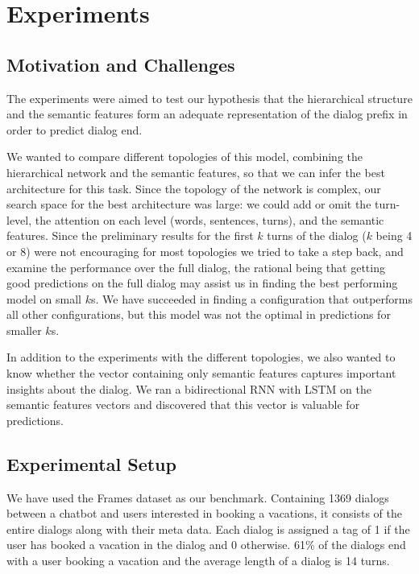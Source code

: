 \section{Experiments}\label{sec:exp}
\subsection{Motivation and Challenges}
The experiments were aimed to test our hypothesis that the hierarchical 
structure and the semantic features form an adequate representation of 
the dialog prefix in order to predict dialog end. 

We wanted to compare different topologies of this model, 
combining the hierarchical network and the semantic features, 
so that we can infer the best architecture for this task. 
Since the topology of the network is complex, our search space for the best architecture 
was large: we could add or omit the turn-level, the attention on each level (words, sentences, turns), 
and the semantic features. 
Since the preliminary results for the first $k$ turns of the dialog ($k$ being 4 or 8) 
were not encouraging for most topologies we tried to take a step back, 
and examine the performance over the full dialog, 
the rational being that getting good predictions on the full dialog may assist 
us in finding the best performing model on small $k$s. 
We have succeeded in finding a configuration that outperforms all other configurations, 
but this model was not the optimal in predictions for smaller $k$s. 

In addition to the experiments with the different topologies, we also wanted to know whether the vector containing only semantic features 
captures important insights about the dialog. 
We ran a bidirectional RNN with LSTM on the semantic features vectors and 
discovered that this vector is valuable for predictions.

\subsection{Experimental Setup}
We have used the Frames dataset \cite{frames} as 
our benchmark. Containing 1369 dialogs between 
a chatbot and users interested in booking a vacations, 
it consists of the entire dialogs along with their meta data. 
Each dialog is assigned a tag of 1 if the user has booked a vacation 
in the dialog and 0 otherwise. 61\% of the dialogs end with a user 
booking a vacation and the average length of a dialog is 14 turns. 

